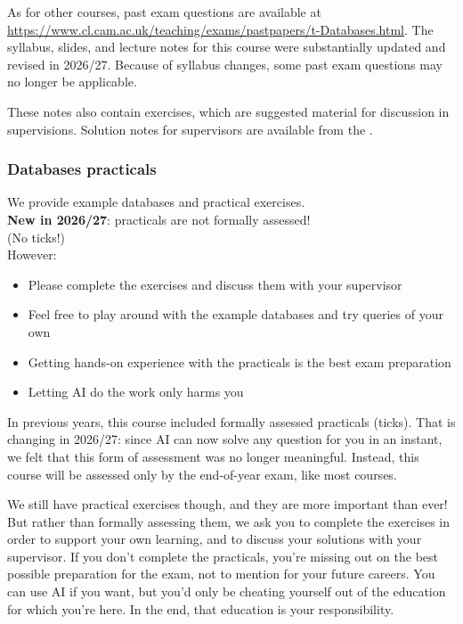As for other courses, past exam questions are available at \url{https://www.cl.cam.ac.uk/teaching/exams/pastpapers/t-Databases.html}.
The syllabus, slides, and lecture notes for this course were substantially updated and revised in 2026/27.
Because of syllabus changes, some past exam questions may no longer be applicable.

These notes also contain exercises, which are suggested material for discussion in supervisions.
Solution notes for supervisors are available from the \materialspage{}.

\begin{frame}
    \label{s:practicals}
    \frametitle{Databases practicals}
    We provide example databases and practical exercises.\\[1em]
    \textbf{New in 2026/27}: practicals are not formally assessed!\\(No ticks!)\\[1em]
    However:\pause
    \begin{itemize}
        \item Please complete the exercises and discuss them with your supervisor
        \item Feel free to play around with the example databases and try queries of your own
        \item Getting hands-on experience with the practicals is the best exam preparation
        \item Letting AI do the work only harms you
    \end{itemize}
\end{frame}
\label{l:practicals}

In previous years, this course included formally assessed practicals (ticks).
That is changing in 2026/27: since AI can now solve any question for you in an instant, we felt that this form of assessment was no longer meaningful.
Instead, this course will be assessed only by the end-of-year exam, like most courses.

We still have practical exercises though, and they are more important than ever!
But rather than formally assessing them, we ask you to complete the exercises in order to support your own learning, and to discuss your solutions with your supervisor.
If you don't complete the practicals, you're missing out on the best possible preparation for the exam, not to mention for your future careers.
You can use AI if you want, but you'd only be cheating yourself out of the education for which you're here.
In the end, that education is your responsibility.


